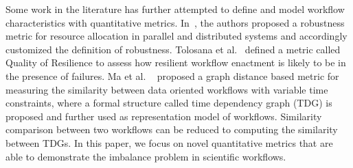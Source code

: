 Some work in the literature has further attempted to define and model workflow characteristics with quantitative metrics. In~\cite{Ali2004}, the authors proposed a robustness metric for resource allocation in parallel and distributed systems and accordingly customized the definition of robustness. Tolosana et al.~\cite{Tolosana2011} defined a metric called Quality of Resilience to assess how resilient workflow enactment is likely to be in the presence of failures. Ma et al. ~\cite{Ma:2014:GDB:2560969.2561388} proposed a graph distance based metric for measuring the similarity between data oriented workflows with variable time constraints, where a formal structure called time dependency graph (TDG) is proposed and further used as representation model of workflows. Similarity comparison between two workflows can be reduced to computing the similarity between TDGs. In this paper, we focus on novel quantitative metrics that are able to demonstrate the imbalance problem in scientific workflows. 







